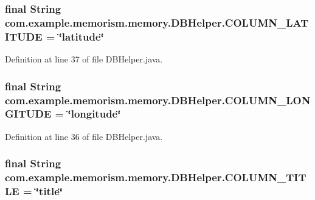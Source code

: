\subsubsection[{\texorpdfstring{C\+O\+L\+U\+M\+N\+\_\+\+L\+A\+T\+I\+T\+U\+DE}{COLUMN_LATITUDE}}]{\setlength{\rightskip}{0pt plus 5cm}final String com.\+example.\+memorism.\+memory.\+D\+B\+Helper.\+C\+O\+L\+U\+M\+N\+\_\+\+L\+A\+T\+I\+T\+U\+DE = \char`\"{}latitude\char`\"{}\hspace{0.3cm}{\ttfamily [static]}}\hypertarget{classcom_1_1example_1_1memorism_1_1memory_1_1_d_b_helper_aef173dee96dd1d3292ed86bc1394fb37}{}\label{classcom_1_1example_1_1memorism_1_1memory_1_1_d_b_helper_aef173dee96dd1d3292ed86bc1394fb37}


Definition at line 37 of file D\+B\+Helper.\+java.

\subsubsection[{\texorpdfstring{C\+O\+L\+U\+M\+N\+\_\+\+L\+O\+N\+G\+I\+T\+U\+DE}{COLUMN_LONGITUDE}}]{\setlength{\rightskip}{0pt plus 5cm}final String com.\+example.\+memorism.\+memory.\+D\+B\+Helper.\+C\+O\+L\+U\+M\+N\+\_\+\+L\+O\+N\+G\+I\+T\+U\+DE = \char`\"{}longitude\char`\"{}\hspace{0.3cm}{\ttfamily [static]}}\hypertarget{classcom_1_1example_1_1memorism_1_1memory_1_1_d_b_helper_a853f90958b6e860ffa3fea8c315b7c26}{}\label{classcom_1_1example_1_1memorism_1_1memory_1_1_d_b_helper_a853f90958b6e860ffa3fea8c315b7c26}


Definition at line 36 of file D\+B\+Helper.\+java.

\subsubsection[{\texorpdfstring{C\+O\+L\+U\+M\+N\+\_\+\+T\+I\+T\+LE}{COLUMN_TITLE}}]{\setlength{\rightskip}{0pt plus 5cm}final String com.\+example.\+memorism.\+memory.\+D\+B\+Helper.\+C\+O\+L\+U\+M\+N\+\_\+\+T\+I\+T\+LE = \char`\"{}title\char`\"{}\hspace{0.3cm}{\ttfamily [static]}}\hypertarget{classcom_1_1example_1_1memorism_1_1memory_1_1_d_b_helper_ab96886bfdaf0e3551201f4e03f1e4ad0}{}\label{classcom_1_1example_1_1memorism_1_1memory_1_1_d_b_helper_ab96886bfdaf0e3551201f4e03f1e4ad0}


